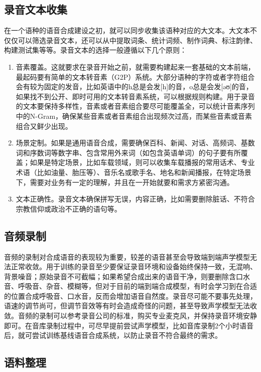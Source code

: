 \documentclass[cn,10pt,math=newtx,citestyle=gb7714-2015,bibstyle=gb7714-2015]{elegantbook}
\begin{document}
\subsection{录音文本收集}

在一个语种的语音合成建设之初，就可以同步收集该语种对应的大文本。大文本不仅仅可以筛选录音文本，还可以从中提取词条、统计词频、制作词典、标注韵律、构建测试集等等。录音文本的选择一般遵循以下几个原则：

\begin{enumerate}
  \item 音素覆盖。这就要求在录音开始之前，就需要构建起来一套基础的文本前端，最起码要有简单的文本转音素（G2P）系统。大部分语种的字符或者字符组合会有较为固定的发音，比如英语中的h总是会发[h]的音，o总是会发[əʊ]的音，如果找不到公开、即时可用的文本转音素系统，可以根据规则构建。用于录音的文本要保持多样性，音素或者音素组合要尽可能覆盖全，可以统计音素序列中的N-Gram，确保某些音素或者音素组合出现频次过高，而某些音素或音素组合又鲜少出现。
  \item 场景定制。如果是通用语音合成，需要确保百科、新闻、对话、高频词、基数词和序数词等数字串、包含常用外来词（如包含英语单词）的句子要有所覆盖；如果是特定场景，比如车载领域，则可以收集车载播报的常用话术、专业术语（比如油量、胎压等）、音乐名或歌手名、地名和新闻播报，在特定场景下，需要对业务有一定的理解，并且在一开始就要和需求方紧密沟通。
  \item 文本正确性。录音文本确保拼写无误，内容正确，比如需要删除脏话、不符合宗教信仰或政治不正确的语句等。
\end{enumerate}

\subsection{音频录制}

音频的录制对合成语音的表现较为重要，较差的语音甚至会导致端到端声学模型无法正常收敛。用于训练的录音至少要保证录音环境和设备始终保持一致，无混响、背景噪音；原始录音不可截幅；如果希望合成出来的语音干净，则要删除含口水音、呼吸音、杂音、模糊等，但对于目前的端到端合成模型，有时会学习到在合适的位置合成呼吸音、口水音，反而会增加语音自然度。录音尽可能不要事先处理，语速的调节尚可，但调节音效等有时会造成奇怪的问题，甚至导致声学模型无法收敛。音频的录制可以参考录音公司的标准，购买专业麦克风，并保持录音环境安静即可。在音库录制过程中，可尽早提前尝试声学模型，比如音库录制2个小时语音后，就可尝试训练基线语音合成系统，以防止录音不符合最终的需求。

\subsection{语料整理}
\end{document}
